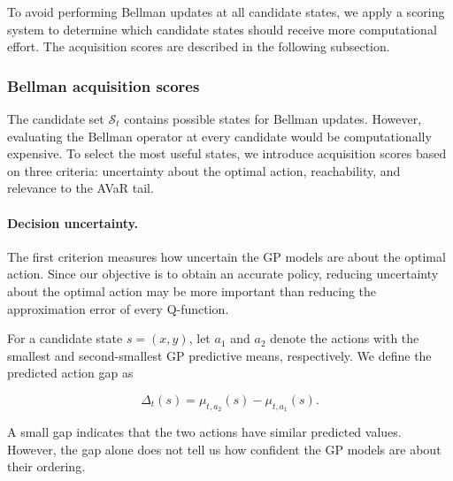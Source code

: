 To avoid performing Bellman updates at all candidate states, we apply a scoring system to determine which candidate states should receive more computational effort. The acquisition scores are described in the following subsection.

\subsubsection{Bellman acquisition scores}
\label{method:acquisition}

The candidate set $\mathcal S_t$ contains possible states for Bellman updates. However, evaluating the Bellman operator at every candidate would be computationally expensive. To select the most useful states, we introduce acquisition scores based on three criteria: uncertainty about the optimal action, reachability, and relevance to the AVaR tail.

\paragraph{Decision uncertainty.}

The first criterion measures how uncertain the GP models are about the optimal action. Since our objective is to obtain an accurate policy, reducing uncertainty about the optimal action may be more important than reducing the approximation error of every Q-function.

For a candidate state $s=(x,y)$, let $a_1$ and $a_2$ denote the actions with the smallest and second-smallest GP predictive means, respectively. We define the predicted action gap as

\begin{equation}
	\Delta_t(s)
	=
	\mu_{t,a_2}(s)-\mu_{t,a_1}(s).
	\label{decision-gap}
\end{equation}

A small gap indicates that the two actions have similar predicted values. However, the gap alone does not tell us how confident the GP models are about their ordering.

